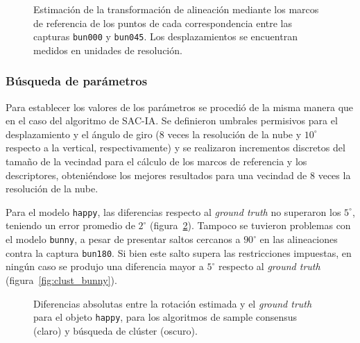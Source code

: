		\begin{figure}
			\centering
			\begin{subfigure}{\linewidth}
				\centering
				
			\end{subfigure}
			\begin{subfigure}{\linewidth}
				
			\end{subfigure}
				\caption[Estimación de la transformación de alineación mediante los marcos de referencia]{\label{fig:cluster}Estimación de la transformación de alineación
				mediante los marcos de referencia de los puntos de cada correspondencia
				entre las capturas \texttt{bun000} y \texttt{bun045}. Los desplazamientos se encuentran medidos en unidades de resolución.}
		\end{figure}

		\subsubsection{Búsqueda de parámetros}
			Para establecer los valores de los parámetros se procedió de la
			misma manera que en el caso del algoritmo de SAC-IA.
			Se definieron umbrales permisivos para el desplazamiento y el ángulo de giro
			($8$ veces la resolución de la nube y $10^\circ$ respecto a la vertical, respectivamente)
			y se realizaron incrementos discretos del tamaño de la vecindad para el cálculo de los marcos de referencia y los descriptores,
			obteniéndose los mejores resultados para una vecindad de $8$ veces la resolución de la nube.

			Para el modelo \texttt{happy}, las diferencias respecto al \emph{ground truth}
			no superaron los $5^{\circ}$, teniendo un error promedio de $2^{\circ}$ (figura~\ref{fig:dif_rot_happy}).
			Tampoco se tuvieron problemas con el modelo \texttt{bunny},
			a pesar de presentar saltos cercanos a $90^{\circ}$ en las alineaciones
			contra la captura \texttt{bun180}. Si bien este salto supera las restricciones impuestas,
			en ningún caso se produjo una diferencia mayor a $5^{\circ}$ respecto al \emph{ground truth} (figura~\ref{fig:clust_bunny}).


			\begin{figure}
				
				\caption[Diferencias en la rotación estimada para el objeto \texttt{happy}]
				{\label{fig:dif_rot_happy}Diferencias absolutas entre la rotación estimada y el \emph{ground truth} para el objeto \texttt{happy},
				para los algoritmos de sample consensus (claro) y búsqueda de clúster (oscuro).}
			\end{figure}

